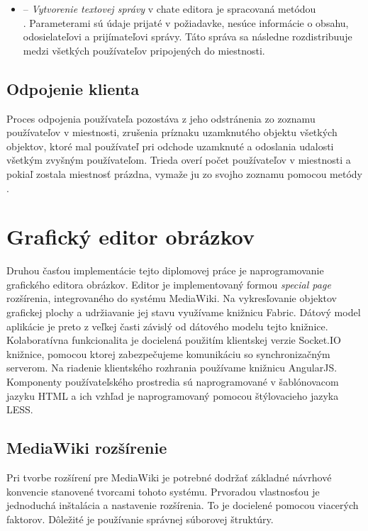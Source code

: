 \begin{itemize}
	\item {} -- \textit{Vytvorenie textovej správy} v chate editora je spracovaná metódou \\ . Parameterami sú údaje prijaté v požiadavke, nesúce informácie o obsahu, odosielateľovi a prijímateľovi správy. Táto správa sa následne rozdistribuuje medzi všetkých používateľov pripojených do miestnosti.
	
\end{itemize}

\subsection{Odpojenie klienta}
Proces odpojenia používateľa pozostáva z jeho odstránenia zo zoznamu používateľov v miestnosti, zrušenia príznaku uzamknutého objektu všetkých objektov, ktoré mal používateľ pri odchode uzamknuté a odoslania udalosti všetkým zvyšným používateľom. Trieda  overí počet používateľov v miestnosti a pokiaľ zostala miestnosť prázdna, vymaže ju zo svojho zoznamu pomocou metódy .





\section{Grafický editor obrázkov}
Druhou časťou implementácie tejto diplomovej práce je naprogramovanie grafického editora obrázkov. Editor je implementovaný formou \textit{special page} rozšírenia, integrovaného do systému MediaWiki. Na vykresľovanie objektov grafickej plochy a udržiavanie jej stavu využívame knižnicu Fabric. Dátový model aplikácie je preto z veľkej časti závislý od dátového modelu tejto knižnice. Kolaboratívna funkcionalita je docielená použitím klientskej verzie Socket.IO knižnice, pomocou ktorej zabezpečujeme komunikáciu so synchronizačným serverom. Na riadenie klientského rozhrania používame knižnicu AngularJS. Komponenty používateľského prostredia sú naprogramované v šablónovacom jazyku HTML a ich vzhľad je naprogramovaný pomocou štýlovacieho jazyka LESS.

\subsection{MediaWiki rozšírenie}
Pri tvorbe rozšírení pre MediaWiki je potrebné dodržať základné návrhové konvencie stanovené tvorcami tohoto systému. Prvoradou vlastnosťou je jednoduchá inštalácia a nastavenie rozšírenia. To je docielené pomocou viacerých faktorov. Dôležité je používanie správnej súborovej štruktúry. 

